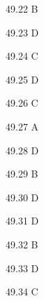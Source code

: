 \begin{Solution}{49.{22}}
B
\end{Solution}
\begin{Solution}{49.{23}}
D
\end{Solution}
\begin{Solution}{49.{24}}
C
\end{Solution}
\begin{Solution}{49.{25}}
D
\end{Solution}
\begin{Solution}{49.{26}}
C
\end{Solution}
\begin{Solution}{49.{27}}
A
\end{Solution}
\begin{Solution}{49.{28}}
D
\end{Solution}
\begin{Solution}{49.{29}}
B
\end{Solution}
\begin{Solution}{49.{30}}
D
\end{Solution}
\begin{Solution}{49.{31}}
D
\end{Solution}
\begin{Solution}{49.{32}}
B
\end{Solution}
\begin{Solution}{49.{33}}
D
\end{Solution}
\begin{Solution}{49.{34}}
C
\end{Solution}
